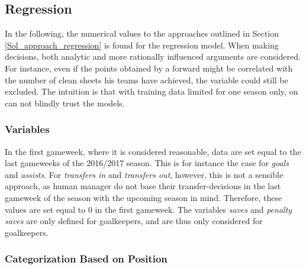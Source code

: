 \subsection{Regression}\label{exp_setup_reg}

In the following, the numerical values to the approaches outlined in Section \ref{Sol_approach_regression} is found for the regression model. When making decisions, both analytic and more rationally influenced arguments are considered. For instance, even if the points obtained by a forward might be correlated with the number of clean sheets his teams have achieved, the variable could still be excluded. The intuition is that with training data limited for one season only, on can not blindly trust the models. 


\subsubsection{Variables}

In the first gameweek, where it is considered reasonable, data are set equal to the last gameweeks of the 2016/2017 season. This is for instance the case for \textit{goals} and \textit{assists}. For \textit{transfers in} and \textit{transfers out}, however, this is not a sensible approach, as human manager do not base their transfer-decisions in the last gameweek of the season with the upcoming season in mind. Therefore, these values are set equal to 0 in the first gameweek. The variables \textit{saves} and \textit{penalty saves} are only defined for goalkeepers, and are thus only considered for goalkeepers.

\subsubsection{Categorization Based on Position} 

